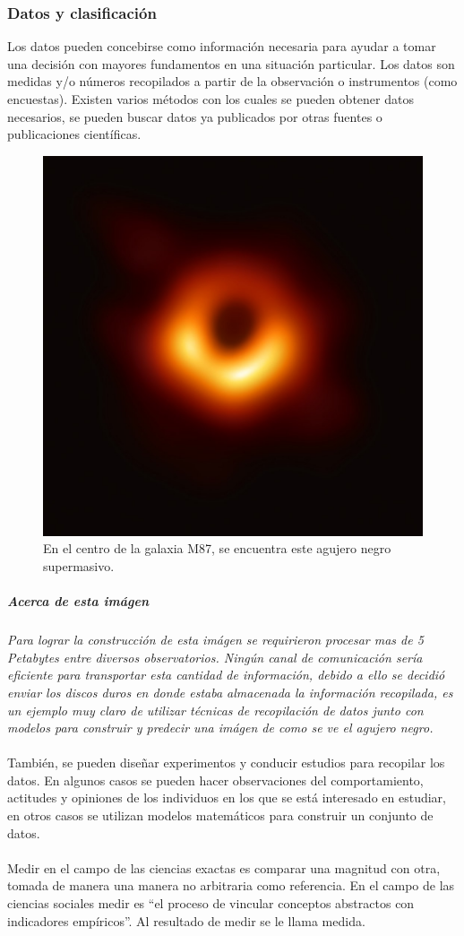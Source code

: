 \documentclass[12pt,hidelinks]{article}
\begin{document}
	\subsubsection{Datos y clasificación} Los datos pueden concebirse como información necesaria para ayudar a tomar una decisión con mayores fundamentos en una situación particular. Los datos son medidas y/o números recopilados a partir de la observación o instrumentos (como encuestas).  Existen varios métodos con los cuales se pueden obtener datos necesarios, se pueden buscar datos ya publicados por otras fuentes o publicaciones científicas.
	\begin{figure}[h!]
		\centering
		\includegraphics[width=0.5\linewidth]{images/2/black_hole.jpg}
		\caption[Agujero Negro M87]{En el centro de la galaxia M87, se encuentra este agujero negro supermasivo.}
	\end{figure}
	\subparagraph{Acerca de esta imágen} \textit{Para lograr la construcción de esta imágen se requirieron procesar mas de 5 Petabytes entre diversos observatorios. Ningún canal de comunicación sería eficiente para transportar esta cantidad de información, debido a ello se decidió enviar los discos duros en donde estaba almacenada la información recopilada, es un ejemplo muy claro de utilizar técnicas de recopilación de datos junto con modelos para construir y predecir una imágen de como se ve el agujero negro.}
	\paragraph{}También, se pueden diseñar experimentos y conducir estudios para recopilar los datos. En algunos casos se pueden hacer observaciones del comportamiento, actitudes y opiniones de los individuos en los que se está interesado en estudiar, en otros casos se utilizan modelos matemáticos para construir un conjunto de datos.
	\paragraph{}Medir en el campo de las ciencias exactas es comparar una magnitud con otra, tomada de manera una manera no arbitraria como referencia. En el campo de las ciencias sociales medir es “el proceso de vincular conceptos abstractos con indicadores empíricos”. Al resultado de medir se le llama medida.
\end{document}
